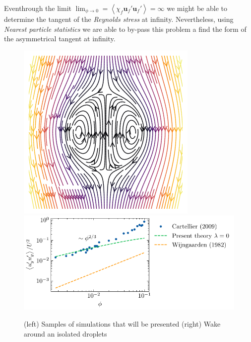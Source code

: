 \documentclass[a4paper,11pt]{article}
\newcommand{\avg}[1]{\left<#1\right>}
\theoremstyle{mytheoremstyle}
\theoremstyle{mytheoremstyle}
\theoremstyle{myproblemstyle}
\begin{document}
Eventhrough the limit $\lim_{\phi \to 0} =\avg{\chi_f \textbf{u}_f'\textbf{u}_f'}= \infty$ we might be able to determine the tangent of the \textit{Reynolds stress} at infinity. 
Nevertheless, using \textit{Nearest particle statistics} we are able to by-pass this problem a find the form of the asymmetrical tangent at infinity. 

\begin{figure}[h!]
    \centering
    \includegraphics[height=0.3\textwidth]{image/Rising_Stokes.png}
    \includegraphics[height=0.3\textwidth]{image/HOMOGENEOUS_NEW/CA/cartellier.pdf}
    \caption{(left) Samples of simulations that will be presented
            (right) Wake around an isolated droplets}
    \label{fig:wake}
\end{figure}



\end{document}
